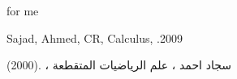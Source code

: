 \documentclass[14pt]{extreport}
\begin{document}
\setLR
for me

\setRL
\begin{thebibliography}{9}
	\setLR
	Sajad, Ahmed, CR, Calculus, .2009

  \setRL
	سجاد احمد ، علم الرياضيات المتقطعة ، .(2000)
\end{thebibliography}
\end{document}
